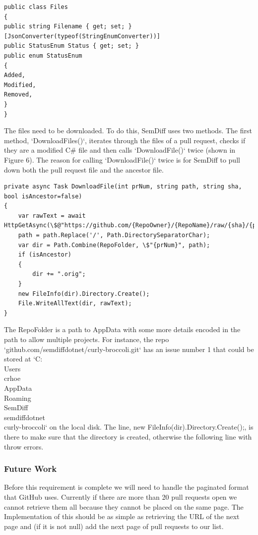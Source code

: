 \documentclass[10pt,draftclsnofoot,onecolumn]{IEEEtran}
\begin{document}
\begingroup
\begin{lstlisting}
public class Files
{
public string Filename { get; set; }
[JsonConverter(typeof(StringEnumConverter))]
public StatusEnum Status { get; set; }
public enum StatusEnum
{
Added,
Modified,
Removed,
}
}
\end{lstlisting}
\endgroup

The files need to be downloaded. To do this, SemDiff uses two methods. The first method, `DownloadFiles()`, iterates through the files of a pull request, checks if they are a modified C\# file and then calls `DownloadFile()` twice (shown in Figure 6). The reason for calling `DownloadFile()` twice is for SemDiff to pull down both the pull request file and the ancestor file. 

\begingroup
\begin{lstlisting}
private async Task DownloadFile(int prNum, string path, string sha, bool isAncestor=false)
{
	var rawText = await HttpGetAsync(\$@"https://github.com/{RepoOwner}/{RepoName}/raw/{sha}/{path}");
	path = path.Replace('/', Path.DirectorySeparatorChar);
	var dir = Path.Combine(RepoFolder, \$"{prNum}", path);
	if (isAncestor)
	{
		dir += ".orig";
	}
	new FileInfo(dir).Directory.Create();
	File.WriteAllText(dir, rawText);
}
\end{lstlisting}
\endgroup

The RepoFolder is a path to AppData with some more details encoded in the path to allow multiple projects. For instance, the repo `github.com/semdiffdotnet/curly-broccoli.git` has an issue number 1 that could be stored at `C:\\Users\\crhoe\\AppData\\Roaming\\SemDiff\\semdiffdotnet\\curly-broccoli\1` on the local disk. The line, new FileInfo(dir).Directory.Create();, is there to make sure that the directory is created, otherwise the following line with throw errors.

\subsubsection{Future Work}
Before this requirement is complete we will need to handle the paginated format that GitHub uses. Currently if there are more than 20 pull requests open we cannot retrieve them all because they cannot be placed on the same page. The Implementation of this should be as simple as retrieving the URL of the next page and (if it is not null) add the next page of pull requests to our list.
\end{document}
